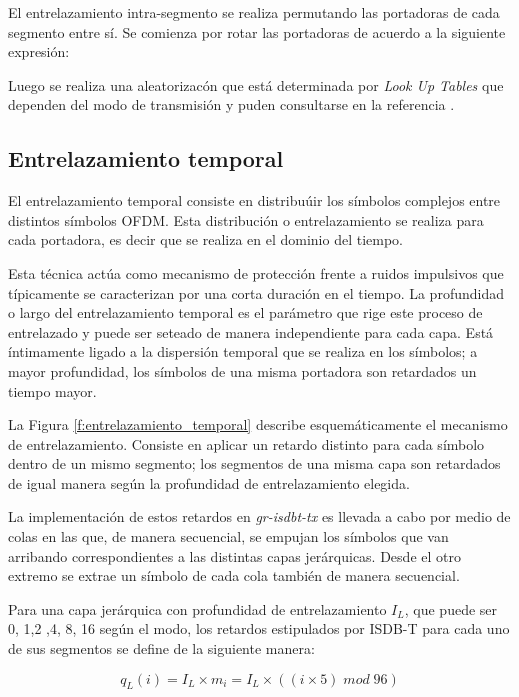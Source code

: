 El entrelazamiento intra-segmento se realiza permutando las portadoras de cada segmento entre s\'i. Se comienza por rotar las portadoras de acuerdo a la siguiente expresi\'on:

Luego se realiza una aleatorizac\'on que est\'a determinada por \textit{Look Up Tables} que dependen del modo de transmisi\'on y puden consultarse en la referencia \cite{bb}.

\subsection{Entrelazamiento temporal}

El entrelazamiento temporal consiste en distribu\'uir los s\'imbolos complejos entre distintos s\'imbolos OFDM. Esta distribuci\'on o entrelazamiento se realiza para cada portadora, es decir que se realiza en el dominio del tiempo.

Esta t\'ecnica act\'ua como mecanismo de protecci\'on frente a ruidos impulsivos que t\'ipicamente se caracterizan por una corta duraci\'on en el tiempo. La profundidad o largo del entrelazamiento temporal es el par\'ametro que rige este proceso de entrelazado y puede ser seteado de manera independiente para cada capa. Est\'a \'intimamente ligado a la dispersi\'on temporal que se realiza en los s\'imbolos; a mayor profundidad, los s\'imbolos de una misma portadora son retardados un tiempo mayor.

La Figura \ref{f:entrelazamiento_temporal} describe esquem\'aticamente el mecanismo de entrelazamiento. Consiste en aplicar un retardo distinto para cada s\'imbolo dentro de un mismo segmento; los segmentos de una misma capa son retardados de igual manera seg\'un la profundidad de entrelazamiento elegida. 

La implementaci\'on de estos retardos en \textit{gr-isdbt-tx} es llevada a cabo por medio de colas en las que, de manera secuencial, se empujan los s\'imbolos que van arribando correspondientes a las distintas capas jer\'arquicas. Desde el otro extremo se extrae un s\'imbolo de cada cola tambi\'en de manera secuencial. 

Para una capa jer\'arquica con profundidad de entrelazamiento $I_L$, que puede ser 0, 1,2 ,4, 8, 16 seg\'un el modo, los retardos estipulados por ISDB-T para cada uno de sus segmentos se define de la siguiente manera:

\begin{equation}
q_L(i) = I_L \times m_i = I_L \times ((i \times 5) \; mod \; 96)
\end{equation}


